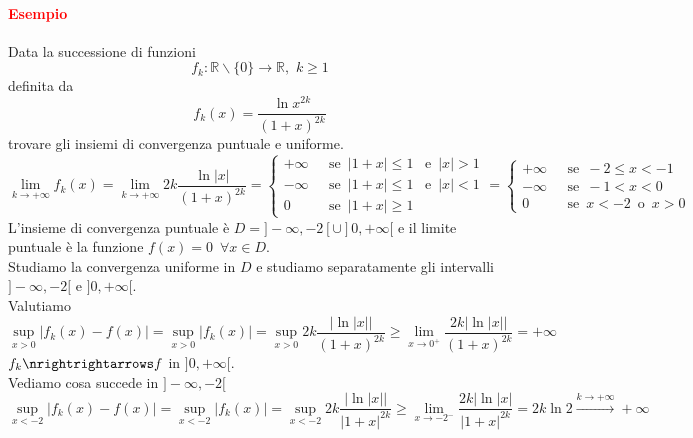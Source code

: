 \documentclass{article}
\newcommand{\R}{\mathbb{R}}
\begin{document}
\paragraph{\textcolor{red}{Esempio}}
Data la successione di funzioni  \\
\begin{equation*}
    f_k: \R \backslash \{0\}\rightarrow \R,\,\, k \geq 1
\end{equation*}
definita da\\
\begin{equation*}
    f_k(x)= \frac{\ln x^{2k}}{(1+x)^{2k}}
\end{equation*}
trovare gli insiemi di convergenza puntuale e uniforme.
\begin{equation*}
    \lim_{k \rightarrow +\infty}f_k(x)= \lim_{k \rightarrow +\infty}2k\frac{\ln |x|}{(1+x)^{2k}}=\begin{cases}
         +\infty \,\,\,\,& \text{se}\,\,\, |1+x|\leq 1 \,\,\,\,\, \text{e}\,\,\, |x|>1 \\
         -\infty \,\,\,\,& \text{se}\,\,\, |1+x|\leq 1 \,\,\,\,\, \text{e}\,\,\, |x|<1 \\
         0 \,\,\,\,& \text{se}\,\,\, |1+x|\geq 1
    \end{cases}
    =\begin{cases}
         +\infty \,\,\,\, &\text{se}\,\,\, -2 \leq x <- 1 \\
         -\infty \,\,\,\, &\text{se}\,\,\, -1 < x <0 \\
         0 \,\,\,\, &\text{se}\,\,\, x< -2 \,\,\, \text{o}\,\,\, x >0
    \end{cases}
\end{equation*}
L'insieme di convergenza puntuale è $D=]-\infty,-2[\cup ]0,+\infty[$ e il limite puntuale è la funzione $f(x) = 0\,\,\, \forall x \in D$.\\
Studiamo la convergenza uniforme in $D$ e studiamo separatamente gli intervalli $]-\infty,-2[$ e $]0,+\infty[$.\\
Valutiamo 
\begin{equation*}
    \sup_{x >0} |f_k(x)-f(x)|= \sup_{x >0}|f_k (x)|=\sup_{x>0}2k \frac{|\ln |x||}{(1+x)^{2k}}\geq \lim_{x \rightarrow 0^+} \frac{2k |\ln|x||}{(1+x)^{2k}}=+\infty
\end{equation*}
$f_k \nrightrightarrows f$ in $]0,+\infty[$.\\
Vediamo cosa succede in $]-\infty,-2[$
\begin{equation*}
    \sup_{x < -2}|f_k(x) -f(x)|= \sup_{x<-2} |f_k(x)|= \sup_{x <-2}2k \frac{|\ln|x||}{|1+x|^{2k}}\geq\lim_{x \rightarrow -2^-} \frac{2k|\ln |x|}{|1+x|^{2k}}= 2k\ln 2 \xrightarrow{k \rightarrow +\infty} +\infty 
\end{equation*}
\end{document}
